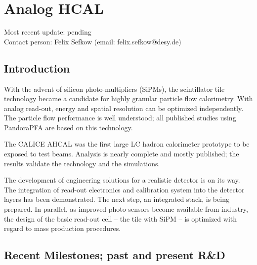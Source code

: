 \section{Analog HCAL}
Most recent update: pending\\
Contact person: Felix Sefkow (email: felix.sefkow@desy.de)
\subsection{Introduction}
With the advent of silicon photo-multipliers (SiPMs), the scintillator tile technology became a candidate for highly granular particle flow calorimetry. With analog read-out, energy and spatial resolution can be optimized independently. The particle flow performance is well understood; all published studies using PandoraPFA are based on this technology.

The CALICE AHCAL was the first large LC hadron calorimeter prototype to be exposed to test beams. Analysis is nearly complete and mostly published; the results validate the technology and the simulations.

The development of engineering solutions for a realistic detector is on its way. The integration of read-out electronics and calibration system into the detector layers has been demonstrated. The next step, an integrated stack, is being prepared. In parallel, as improved photo-sensors become available from industry, the design of the basic read-out cell -- the tile with SiPM -- is optimized with regard to mass production procedures.

\subsection{Recent Milestones; past and present R\&D}
